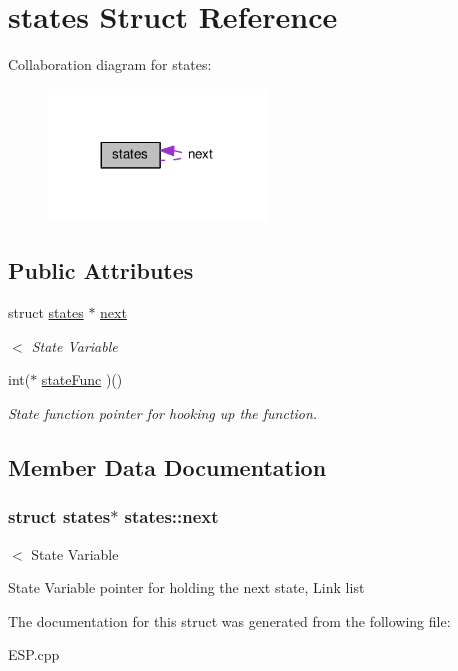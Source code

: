 \hypertarget{structstates}{}\section{states Struct Reference}
\label{structstates}


Collaboration diagram for states\+:
\nopagebreak
\begin{figure}[H]
\begin{center}
\leavevmode
\includegraphics[width=164pt]{structstates__coll__graph}
\end{center}
\end{figure}
\subsection*{Public Attributes}
\begin{DoxyCompactItemize}
\item 
struct \hyperlink{structstates}{states} $\ast$ \hyperlink{structstates_ae75c03bfd8b1791f7e87b217dbe8d33e}{next}
\begin{DoxyCompactList}\small\item\em $<$ State Variable \end{DoxyCompactList}\item 
int($\ast$ \hyperlink{structstates_a647021e88880a0c475530c45589917f2}{state\+Func} )()\hypertarget{structstates_a647021e88880a0c475530c45589917f2}{}\label{structstates_a647021e88880a0c475530c45589917f2}

\begin{DoxyCompactList}\small\item\em State function pointer for hooking up the function. \end{DoxyCompactList}\end{DoxyCompactItemize}


\subsection{Member Data Documentation}
\subsubsection[{\texorpdfstring{next}{next}}]{\setlength{\rightskip}{0pt plus 5cm}struct {\bf states}$\ast$ states\+::next}\hypertarget{structstates_ae75c03bfd8b1791f7e87b217dbe8d33e}{}\label{structstates_ae75c03bfd8b1791f7e87b217dbe8d33e}


$<$ State Variable 

State Variable pointer for holding the next state, Link list 

The documentation for this struct was generated from the following file\+:\begin{DoxyCompactItemize}
\item 
E\+S\+P.\+cpp\end{DoxyCompactItemize}
